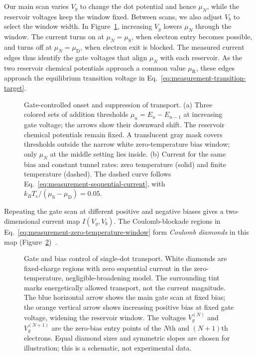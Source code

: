 Our main scan varies $V_g$ to change the dot potential and hence
$\mu_N$, while the reservoir voltages keep the window fixed.
Between scans, we also adjust $V_b$ to select the window width. In
Figure~\ref{fig:transport-addition-window}, increasing $V_g$ lowers
$\mu_N$ through the window. The current turns on at
$\mu_N=\mu_{\mathrm S}$, when electron entry becomes possible,
and turns off at $\mu_N=\mu_{\mathrm D}$, when electron exit is
blocked. The measured current edges thus identify the gate
voltages that align $\mu_N$ with each reservoir. As the two
reservoir chemical potentials approach a common value
$\mu_{\mathrm R}$, these edges approach the equilibrium
transition voltage in
Eq.~\eqref{eq:measurement-transition-target}.

\begin{figure}[htbp]
 \centering
 
 \caption{Gate-controlled onset and suppression of transport.
 (a) Three colored sets of addition thresholds
 $\mu_n=E_n-E_{n-1}$ at increasing gate voltage; the arrows show
 their downward shift.
 The reservoir chemical potentials remain fixed. A translucent gray
 mask covers thresholds outside the narrow white zero-temperature
 bias window;
 only $\mu_N$ at the middle setting lies inside.
 (b) Current for the same bias and constant tunnel rates:
 zero temperature (solid) and finite temperature (dashed).
 The dashed curve follows
 Eq.~\eqref{eq:measurement-sequential-current}, with
 $k_BT_e/(\mu_{\mathrm S}-\mu_{\mathrm D})=0.05$.}
 \label{fig:transport-addition-window}
\end{figure}

Repeating the gate scan at different positive and negative biases
gives a two-dimensional current map $I(V_g,V_b)$. The Coulomb-blockade regions in
Eq.~\eqref{eq:measurement-zero-temperature-window} form
\emph{Coulomb diamonds} in this map
(Figure~\ref{fig:transport-coulomb-diamonds})~\cite{Beenakker1991}.

\begin{figure}[htbp]
 \centering
 
 \caption{Gate and bias control of single-dot transport.
 White diamonds are fixed-charge regions with zero sequential
 current in the zero-temperature, negligible-broadening model.
 The surrounding tint marks energetically allowed transport,
 not the current magnitude. The blue horizontal arrow shows the
 main gate scan at fixed bias; the orange vertical arrow shows
 increasing positive bias at fixed gate voltage, widening the
 reservoir window. The voltages $V_g^{(N)}$ and $V_g^{(N+1)}$ are
 the zero-bias entry points of the $N$th and $(N+1)$th electrons.
 Equal diamond sizes and symmetric
 slopes are chosen for illustration; this is a schematic, not
 experimental data.}
 \label{fig:transport-coulomb-diamonds}
\end{figure}

